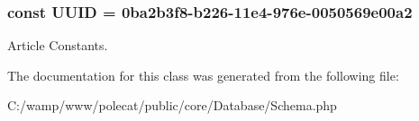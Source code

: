 \subsubsection[{U\+U\+I\+D}]{\setlength{\rightskip}{0pt plus 5cm}const U\+U\+I\+D = \textquotesingle{}0ba2b3f8-\/b226-\/11e4-\/976e-\/0050569e00a2\textquotesingle{}}\label{class_able_polecat___database___schema_a74b892c8c0b86bf9d04c5819898c51e7}
Article Constants. 

The documentation for this class was generated from the following file\+:\begin{DoxyCompactItemize}
\item 
C\+:/wamp/www/polecat/public/core/\+Database/Schema.\+php\end{DoxyCompactItemize}
